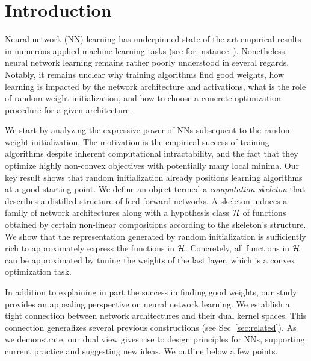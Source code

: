 \section{Introduction}
%
Neural network (NN) learning has underpinned state of the art empirical
results in numerous applied machine learning tasks (see for
instance~\cite{krizhevsky2012imagenet,lecun2015deep}). Nonetheless, neural
network learning remains rather poorly understood in several regards.
Notably, it remains unclear why training algorithms find good weights, how
learning is impacted by the network architecture and activations, what is
the role of random weight initialization, and how to choose a concrete
optimization procedure for a given architecture.

We start by analyzing the expressive power of NNs subsequent to the random
weight initialization. The motivation is the empirical success of training
algorithms despite inherent computational intractability, and the fact that
they optimize highly non-convex objectives with potentially many local minima.
Our key result shows that random initialization already positions learning
algorithms at a good starting point. We define an object termed a {\em
computation skeleton} that describes a distilled structure of feed-forward
networks. A skeleton induces a family of network architectures along with a
hypothesis class ${\cal H}$ of functions obtained by certain non-linear
compositions according to the skeleton's structure.  We show that the
representation generated by random initialization is sufficiently rich to
approximately express the functions in ${\cal H}$. Concretely, all functions in
${\cal H}$ can be approximated by tuning the weights of the last layer, which is
a convex optimization task.

In addition to explaining in part the success in finding good weights, our
study provides an appealing perspective on neural network learning.  We
establish a tight connection between network architectures and their dual
kernel spaces. This connection generalizes several previous constructions
(see Sec~\ref{sec:related}). As we demonstrate, our dual view gives rise to
design principles for NNs, supporting current practice and suggesting
new ideas. We outline below a few points.

